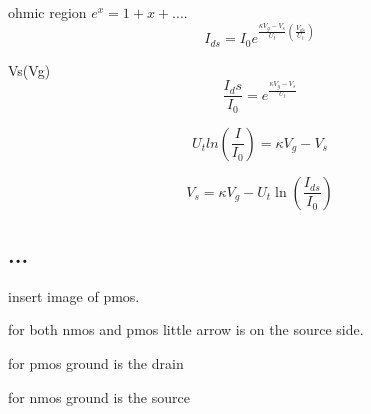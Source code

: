 \documentclass{article}
\begin{document}
ohmic region
\(e^x = 1+x+....\)
\begin{equation}
    I_{ds}= I_0e^{\frac{\kappa V_g - V_s}{U_t} \left(\frac{V_{ds}}{U_t}\right)}
\end{equation}

Vs(Vg)
\begin{equation}
    \frac{I_ds}{I_0}=e^{\frac{\kappa V_g-V_s}{U_t}}
\end{equation}

\begin{equation}
U_t ln (\frac{I}{I_0}) = \kappa V_g - V_s
\end{equation}

\begin{equation}
    V_s = \kappa V_g - U_t \ln \left(\frac{I_{ds}}{I_0}\right)
\end{equation}


\subsection{...}
insert image of pmos.


for both nmos and pmos little arrow is on the source side.

for pmos ground is the drain 

for nmos ground is the source
\end{document}
